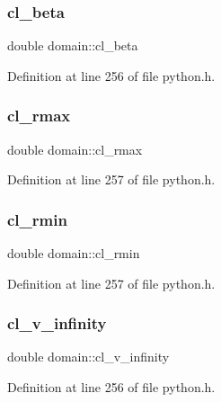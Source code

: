 \subsubsection{\texorpdfstring{cl\+\_\+beta}{cl\_beta}}
{\footnotesize\ttfamily double domain\+::cl\+\_\+beta}



Definition at line 256 of file python.\+h.

\mbox{\label{structdomain_a1aef3bdb197bf825b092b7c5e295ae0b}} 
\subsubsection{\texorpdfstring{cl\+\_\+rmax}{cl\_rmax}}
{\footnotesize\ttfamily double domain\+::cl\+\_\+rmax}



Definition at line 257 of file python.\+h.

\mbox{\label{structdomain_a32773e9268a422a59d6b7b9118d9e966}} 
\subsubsection{\texorpdfstring{cl\+\_\+rmin}{cl\_rmin}}
{\footnotesize\ttfamily double domain\+::cl\+\_\+rmin}



Definition at line 257 of file python.\+h.

\mbox{\label{structdomain_a0ceccfeb97784817b47ad77d6b926840}} 
\subsubsection{\texorpdfstring{cl\+\_\+v\+\_\+infinity}{cl\_v\_infinity}}
{\footnotesize\ttfamily double domain\+::cl\+\_\+v\+\_\+infinity}



Definition at line 256 of file python.\+h.

\mbox{\label{structdomain_aca5df98ed2e93c7629b0cf879392b6a6}} 
